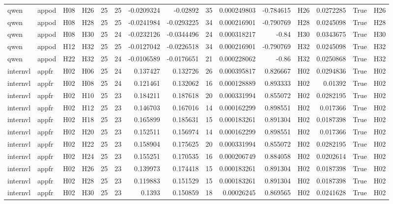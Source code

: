 \begin{longtable}{llllrrrrrrrlrrl}
qwen & appod & H08 & H26 & 25 & 25 & -0.0209324 & -0.02892 & 35 & 0.000249803 & -0.784615 & H26 & 0.0272285 & True & H26 \\
qwen & appod & H08 & H28 & 25 & 25 & -0.0241984 & -0.0293225 & 34 & 0.000216901 & -0.790769 & H28 & 0.0245098 & True & H28 \\
qwen & appod & H08 & H30 & 25 & 24 & -0.0232126 & -0.0344496 & 24 & 0.000318217 & -0.84 & H30 & 0.0343675 & True & H30 \\
qwen & appod & H12 & H32 & 25 & 25 & -0.0127042 & -0.0226518 & 34 & 0.000216901 & -0.790769 & H32 & 0.0245098 & True & H32 \\
qwen & appod & H22 & H32 & 25 & 24 & -0.0106589 & -0.0176651 & 21 & 0.000228062 & -0.86 & H32 & 0.0250868 & True & H32 \\
internvl & appfr & H02 & H06 & 25 & 24 & 0.137427 & 0.132726 & 26 & 0.000395817 & 0.826667 & H02 & 0.0294836 & True & H02 \\
internvl & appfr & H02 & H08 & 25 & 24 & 0.121461 & 0.132062 & 16 & 0.000128889 & 0.893333 & H02 & 0.01392 & True & H02 \\
internvl & appfr & H02 & H10 & 25 & 23 & 0.184211 & 0.187618 & 20 & 0.000331994 & 0.855072 & H02 & 0.0282195 & True & H02 \\
internvl & appfr & H02 & H12 & 25 & 23 & 0.146703 & 0.167016 & 14 & 0.000162299 & 0.898551 & H02 & 0.017366 & True & H02 \\
internvl & appfr & H02 & H18 & 25 & 23 & 0.165899 & 0.185631 & 15 & 0.000183261 & 0.891304 & H02 & 0.0187398 & True & H02 \\
internvl & appfr & H02 & H20 & 25 & 23 & 0.152511 & 0.156974 & 14 & 0.000162299 & 0.898551 & H02 & 0.017366 & True & H02 \\
internvl & appfr & H02 & H22 & 25 & 23 & 0.158904 & 0.175625 & 20 & 0.000331994 & 0.855072 & H02 & 0.0282195 & True & H02 \\
internvl & appfr & H02 & H24 & 25 & 23 & 0.155251 & 0.170535 & 16 & 0.000206749 & 0.884058 & H02 & 0.0202614 & True & H02 \\
internvl & appfr & H02 & H26 & 25 & 23 & 0.139973 & 0.174418 & 15 & 0.000183261 & 0.891304 & H02 & 0.0187398 & True & H02 \\
internvl & appfr & H02 & H28 & 25 & 23 & 0.119883 & 0.151529 & 15 & 0.000183261 & 0.891304 & H02 & 0.0187398 & True & H02 \\
internvl & appfr & H02 & H30 & 25 & 23 & 0.1393 & 0.150859 & 18 & 0.00026245 & 0.869565 & H02 & 0.0241628 & True & H02 \\

\end{longtable}
